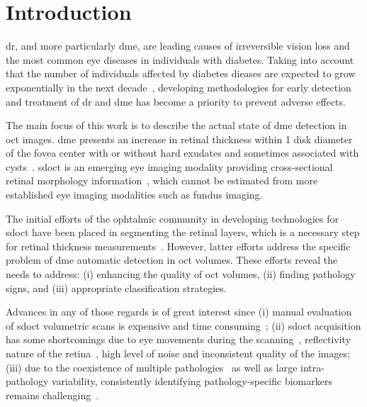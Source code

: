 \graphicspath{ {./content/intro/figures/} }

\section{Introduction}
\label{sec:intro}  %

\gls{dr}, and more particularly \gls{dme}, are leading causes of irreversible vision loss and the most common eye diseases in individuals with diabetes.
Taking into account that the number of individuals affected by diabetes dieases are expected to grow exponentially in the next decade~\cite{wild2004global},
developing methodologies for early detection and treatment of \gls{dr} and \gls{dme} has become a priority to prevent adverse effects.

The main focus of this work is to describe the actual state of \gls{dme} detection in \gls{oct} images.
\gls{dme} presents an increase in retinal thickness within 1 disk diameter of the fovea center with or without hard exudates and sometimes associated with cysts~\cite{ETDRSG1985}.
\gls{sdoct} is an emerging eye imaging modality providing cross-sectional retinal morphology information~\cite{Wang2015}, which cannot be estimated from more established eye imaging modalities such as fundus imaging.

The initial efforts of the ophtalmic community in developing technologies for \gls{sdoct} have been placed in segmenting the retinal layers, which is a necessary step for retinal thickness measurements~\cite{Chiu2010,Kafieh2013}.
However, latter efforts address the specific problem of \gls{dme} automatic detection in \gls{oct} volumes.
These efforts reveal the needs to address: (i) enhancing the quality of \gls{oct} volumes,
(ii) finding pathology signs,
and (iii) appropriate classification strategies.

Advances in any of those regards is of great interest since (i) manual evaluation of \gls{sdoct} volumetric scans is expensive and time consuming~\cite{Venhuizen2015};
(ii) \gls{sdoct} acquisition has some shortcomings due to eye movements during the scanning~\cite{Liu2011}, reflectivity nature of the retina~\cite{schuman2004optical}, high level of noise and inconsistent quality of the images;
(iii) due to the coexistence of multiple pathologies~\cite{Liu2011} as well as large intra-pathology variability, consistently identifying pathology-specific biomarkers remains challenging~\cite{Venhuizen2015}.

